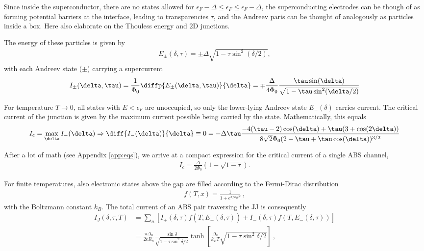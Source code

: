Since inside the superconductor, there are no states allowed for $\epsilon_F - \Delta \leq \epsilon_F \leq \epsilon_F - \Delta$, the superconducting electrodes can be though of as forming potential barriers at the interface, leading to transparencies $\tau$, and the Andreev paris can be thought of analogously as particles inside a box.
Here also elaborate on the Thouless energy and 2D junctions.

The energy of these particles is given by
%
\begin{eqnarray}
E_{\pm}(\delta,\tau)=\pm\Delta\sqrt{1-\tau\sin^2(\delta/2)},
\end{eqnarray}
%
with each Andreev state ($\pm$) carrying a supercurrent
%
\begin{eqnarray}
I_{\pm}(\delta,\tau)=\frac{1}{\Phi_0}\diffp{ E_{\pm}(\delta,\tau)}{\delta}=\mp\frac{\Delta}{4\Phi_0}\frac{\tau\sin(\delta)}{\sqrt{1-\tau\sin^2(\delta/2)}}
\label{eq:CPR-full}
\end{eqnarray}

For temperature $T\rightarrow0$, all states with $E<\epsilon_F$ are unoccupied, so only the lower-lying Andreev state $E_{-}(\delta)$ carries current.
%
The critical current of the junction is given by the maximum current possible being carried by the state. Mathematically, this equals
%
\begin{eqnarray}
I_c=\max_\delta I_{-}(\delta) \Rightarrow \diff{I_{-}(\delta)}{\delta}\equiv0=-\Delta\tau\frac{-4(\tau-2)\cos(\delta)+\tau(3+\cos(2\delta))}{8\sqrt{2}\Phi_0(2-\tau+\tau\cos(\delta))^{3/2}}
\label{eq:ABS-start}
\end{eqnarray}

After a lot of math (see Appendix \ref{app:eqs}), we arrive at a compact expression for the critical current of a single ABS channel,
%
\begin{eqnarray}
I_c = \frac{\Delta}{2\Phi_0}\left( 1-\sqrt{1-\tau} \right).
\label{eq:ABS-stop}
\end{eqnarray}

For finite temperatures, also electronic states above the gap are filled according to the Fermi-Dirac distribution
\begin{align}
f(T,x)=\frac{1}{1+e^{x/k_BT}} \ ,
\label{eq:fermidirac}
\end{align}
with the Boltzmann constant $k_B$.
%
The total current of an ABS pair traversing the JJ is consequently
\begin{align}
I_J(\delta,\tau,T) &= \sum_n \left[ I_+\left(\delta,\tau\right) f\left(T,E_+\left(\delta,\tau\right)\right) + I_-\left(\delta,\tau\right) f\left(T,E_-\left(\delta,\tau\right)\right) \right] \\
&=\frac{\pi\Delta_0}{2 e R_n} \frac{\sin\delta}{\sqrt{1 - \tau \sin^2\delta / 2}} \tanh\left[\frac{\Delta_0}{k_B T} \sqrt{1 - \tau \sin^2\delta / 2}\right]\ ,
\label{eq:CPR-ball}
\end{align}



